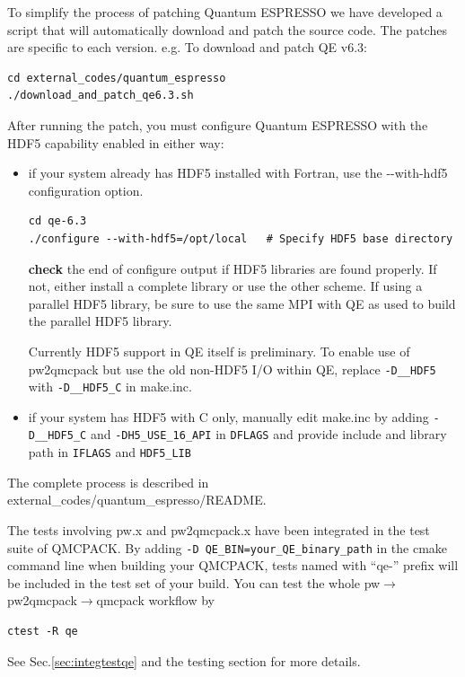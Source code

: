 To simplify the process of patching Quantum ESPRESSO we have developed
a script that will automatically download and patch the source
code. The patches are specific to each version. e.g. To download and
patch QE v6.3:
\verbatimfont{\footnotesize}
\begin{verbatim}
cd external_codes/quantum_espresso
./download_and_patch_qe6.3.sh
\end{verbatim}
After running the patch, you must configure Quantum ESPRESSO with
the HDF5 capability enabled in either way:
\begin{itemize}
\item if your system already has HDF5 installed with Fortran, use the -{}-with-hdf5 configuration option.
\verbatimfont{\footnotesize}
\begin{verbatim}
cd qe-6.3
./configure --with-hdf5=/opt/local   # Specify HDF5 base directory
\end{verbatim}
   {\bf check} the end of configure output if HDF5 libraries are found properly.
   If not, either install a complete library or use the other scheme. If using a parallel HDF5 library, be sure to use
   the same MPI with QE as used to build the parallel HDF5 library.

   Currently HDF5 support in QE itself is preliminary. To enable use of pw2qmcpack
   but use the old non-HDF5 I/O within QE, replace \texttt{-D\_\_HDF5} with \texttt{-D\_\_HDF5\_C} in make.inc.
\item if your system has HDF5 with C only, manually edit make.inc by adding \texttt{-D\_\_HDF5\_C} and \texttt{-DH5\_USE\_16\_API}
   in \texttt{DFLAGS} and provide include and library path in \texttt{IFLAGS} and \texttt{HDF5\_LIB}
\end{itemize}

The complete process is described in external\_codes/quantum\_espresso/README.

The tests involving pw.x and pw2qmcpack.x have been integrated in the test suite of QMCPACK.
By adding \texttt{-D QE\_BIN=your\_QE\_binary\_path} in the cmake command line when building your QMCPACK,
tests named with ``qe-'' prefix will be included in the test set of your build.
You can test the whole pw$\to$pw2qmcpack$\to$qmcpack workflow by
\verbatimfont{\footnotesize}
\begin{verbatim}
ctest -R qe
\end{verbatim}
See Sec.\ref{sec:integtestqe} and the testing section for more details.

